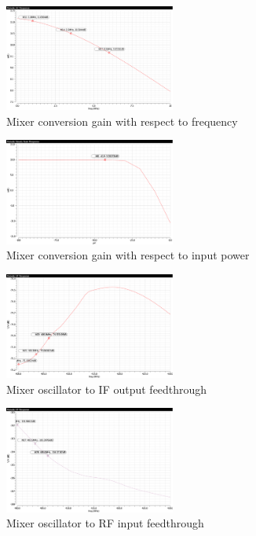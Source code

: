 \begin{figure}[h]
   \centering
    \includegraphics[width=0.5\textwidth]{figures/MixerConversionGainFreq.pdf}
    \caption{Mixer conversion gain with respect to frequency}
    \label{fig:cgfreq}
\end{figure}

\begin{figure}[h]
   \centering
    \includegraphics[width=0.5\textwidth]{figures/MixerConversionGain.pdf}
    \caption{Mixer conversion gain with respect to input power}
    \label{fig:cgpwr}
\end{figure}


\begin{figure}[h]
   \centering
    \includegraphics[width=0.5\textwidth]{figures/MixerLO-IFfeed.pdf}
    \caption{Mixer oscillator to IF output feedthrough}
    \label{fig:loif}
\end{figure}

\begin{figure}[h]
   \centering
    \includegraphics[width=0.5\textwidth]{figures/MixerLO-RFfeed.pdf}
    \caption{Mixer oscillator to RF input feedthrough}
    \label{fig:lorf}
\end{figure}

